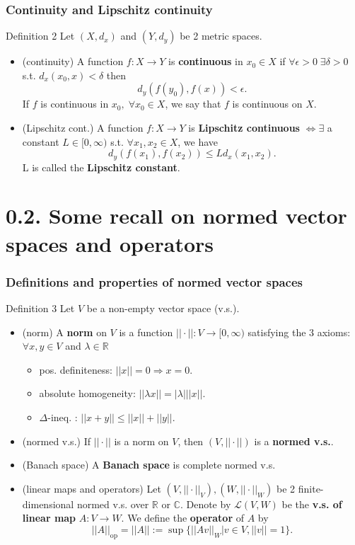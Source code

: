 \documentclass[10pt]{beamer}
\newcommand{\R}{\mathbb{R}}
\newcommand{\C}{\mathbb{C}}
\begin{document}
{\begin{frame}
\frametitle{Continuity and Lipschitz continuity}
\begin{alertblock}{Definition 2}
Let $(X,d_x)$ and $(Y,d_y)$ be 2 metric spaces. 
\begin{itemize}
\item (continuity) A function $f:X \rightarrow Y$ is \textbf{continuous} in $x_0 \in X$ if $\forall \epsilon >0 \; \exists \delta >0$ s.t.  $d_x(x_0,x) < \delta$ then $$d_y(f(y_0),f(x)) < \epsilon.$$
If $f$ is continuous in $x_0, \; \forall x_0\in X$, we say that $f$ is continuous on $X$.
\item (Lipschitz cont.) A function  $f:X \rightarrow Y$ is \textbf{Lipschitz continuous} $\iff \exists$ a constant $L \in [0,\infty)$ s.t. $\forall x_1,x_2 \in X$, we have
$$d_y(f(x_1),f(x_2)) \leq L d_x(x_1,x_2).$$
L is called the \textbf{Lipschitz constant}.
\end{itemize}
\end{alertblock}
\end{frame}





\section{0.2.  Some recall on normed vector spaces and operators}

\begin{frame}
\frametitle{Definitions and properties of normed vector spaces}
\begin{alertblock}{Definition 3}
Let $V$ be a non-empty vector space (v.s.).
\begin{itemize}
\item (norm) A \textbf{norm} on $V$ is a function $||\cdot||:V \rightarrow [0, \infty)$ satisfying the 3 axioms: $\forall x,y \in V$ and $\lambda \in \R$
\begin{itemize}
\item[(i)] pos. definiteness: $||x||=0 \Rightarrow x=0$.
\item[(ii)] absolute homogeneity: $||\lambda x||=|\lambda| ||x||$.
\item[(iii)] $\Delta$-ineq. : $||x+y||\leq ||x||+||y||$.
\end{itemize}
\item (normed v.s.) If $||\cdot||$ is a norm on $V$, then $(V,||\cdot||)$ is a \textbf{normed v.s.}.
\item (Banach space) A \textbf{Banach space} is complete normed v.s.
\item (linear maps and operators) Let $(V,||\cdot||_V), (W,||\cdot||_W)$ be 2 finite-dimensional normed v.s. over $\R$ or $\C$.  Denote by $\mathcal{L}(V,W)$ be the \textbf{v.s. of linear map} $A:V \rightarrow W$.
We define the \textbf{operator} of $A$ by
$$||A||_{\text{op}}=||A||:=\sup\{||Av||_{W}| v\in V, ||v||=1\}.$$
\end{itemize}
\end{alertblock}
\end{frame}

}
\end{document}
